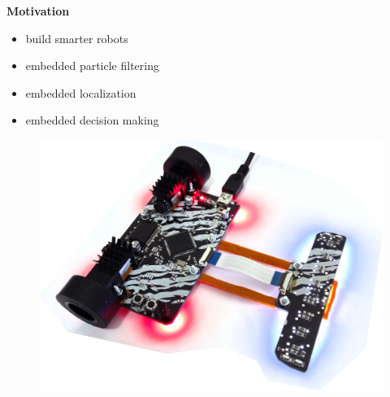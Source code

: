 \documentclass[xcolor=dvipsnames]{beamer}
\begin{document}
\begin{frame}{\bf Motivation}

\begin{itemize}
  \item build smarter robots
  \item embedded particle filtering
  \item embedded localization
  \item embedded decision making
\end{itemize}

  \begin{figure}
    \includegraphics[scale=0.07]{../pictures/robot_ascender.jpg}
  \end{figure}


\end{frame}
\end{document}
